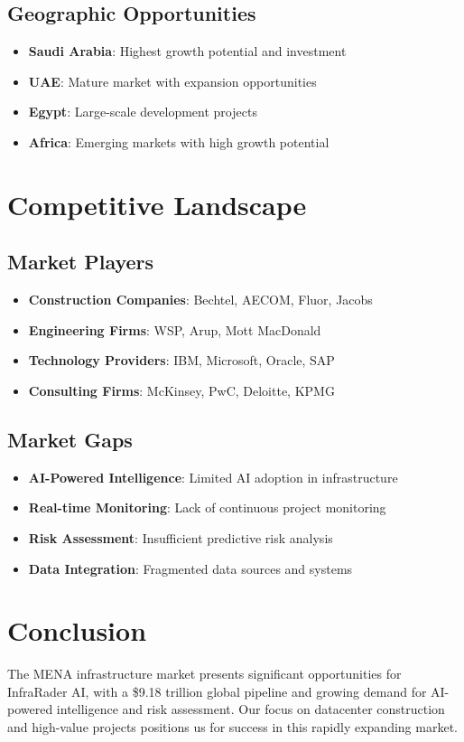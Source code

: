 \documentclass[business]{../templates/infraradar-main}
\begin{document}
\subsection{Geographic Opportunities}
\begin{itemize}
    \item \textbf{Saudi Arabia}: Highest growth potential and investment
    \item \textbf{UAE}: Mature market with expansion opportunities
    \item \textbf{Egypt}: Large-scale development projects
    \item \textbf{Africa}: Emerging markets with high growth potential
\end{itemize}

\section{Competitive Landscape}

\subsection{Market Players}
\begin{itemize}
    \item \textbf{Construction Companies}: Bechtel, AECOM, Fluor, Jacobs
    \item \textbf{Engineering Firms}: WSP, Arup, Mott MacDonald
    \item \textbf{Technology Providers}: IBM, Microsoft, Oracle, SAP
    \item \textbf{Consulting Firms}: McKinsey, PwC, Deloitte, KPMG
\end{itemize}

\subsection{Market Gaps}
\begin{itemize}
    \item \textbf{AI-Powered Intelligence}: Limited AI adoption in infrastructure
    \item \textbf{Real-time Monitoring}: Lack of continuous project monitoring
    \item \textbf{Risk Assessment}: Insufficient predictive risk analysis
    \item \textbf{Data Integration}: Fragmented data sources and systems
\end{itemize}

\section{Conclusion}

The MENA infrastructure market presents significant opportunities for InfraRader AI, with a \$9.18 trillion global pipeline and growing demand for AI-powered intelligence and risk assessment. Our focus on datacenter construction and high-value projects positions us for success in this rapidly expanding market.
\end{document}
